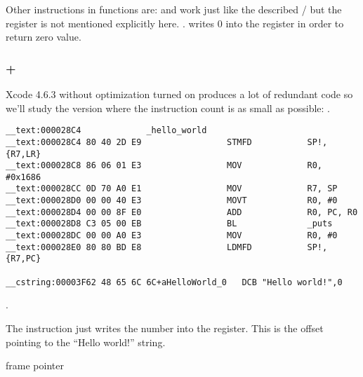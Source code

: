 {Other instructions in functions are: \PUSH and \POP work just like the described / but the \SP register is not mentioned explicitly here}.
 .
 
{writes $0$ into the \Rzero register in order to return zero value}.

\subsubsection{\OptimizingXcode + \ARMMode}

Xcode 4.6.3 
{without optimization turned on produces a lot of redundant code so we'll study the version where the instruction count is as small as possible}: \Othree.

\begin{lstlisting}[caption=\OptimizingXcode + \ARMMode]
__text:000028C4             _hello_world
__text:000028C4 80 40 2D E9                 STMFD           SP!, {R7,LR}
__text:000028C8 86 06 01 E3                 MOV             R0, #0x1686
__text:000028CC 0D 70 A0 E1                 MOV             R7, SP
__text:000028D0 00 00 40 E3                 MOVT            R0, #0
__text:000028D4 00 00 8F E0                 ADD             R0, PC, R0
__text:000028D8 C3 05 00 EB                 BL              _puts
__text:000028DC 00 00 A0 E3                 MOV             R0, #0
__text:000028E0 80 80 BD E8                 LDMFD           SP!, {R7,PC}

__cstring:00003F62 48 65 6C 6C+aHelloWorld_0   DCB "Hello world!",0
\end{lstlisting}

  \AndENRU {} .

{The \MOV instruction just writes the number  into the \Rzero register.
This is the offset pointing to the ``Hello world!'' string}.

\cite{IOSABI}
 frame pointer

